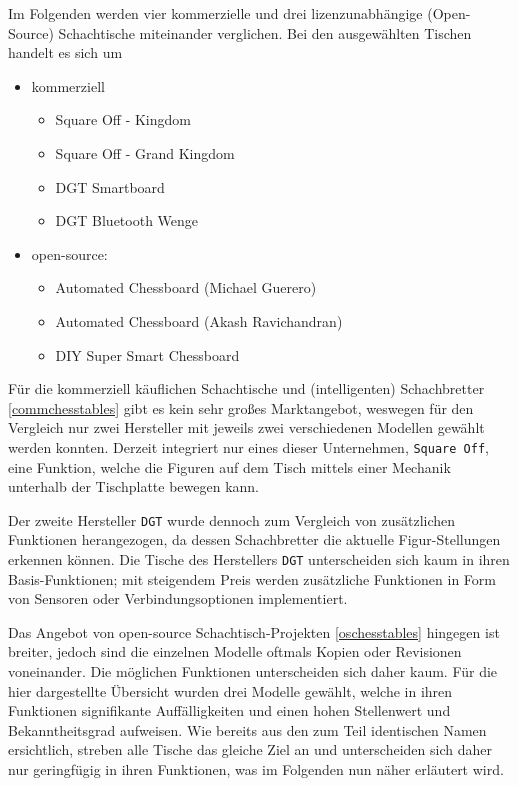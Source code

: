 Im Folgenden werden vier kommerzielle und drei lizenzunabhängige
(Open-Source) Schachtische miteinander verglichen. Bei den ausgewählten
Tischen handelt es sich um

\begin{itemize}
\tightlist
\item
  kommerziell

  \begin{itemize}
  \tightlist
  \item
    Square Off - Kingdom \cite{squareoffkingdom}
  \item
    Square Off - Grand Kingdom \cite{squareoffgrand}
  \item
    DGT Smartboard \cite{dtgsmartboard}
  \item
    DGT Bluetooth Wenge \cite{dtgble}
  \end{itemize}
\item
  open-source:

  \begin{itemize}
  \tightlist
  \item
    Automated Chessboard (Michael Guerero) \cite{actproject1}
  \item
    Automated Chessboard (Akash Ravichandran) \cite{actproject2}
  \item
    DIY Super Smart Chessboard \cite{actproject3}
  \end{itemize}
\end{itemize}

Für die kommerziell käuflichen Schachtische und (intelligenten)
Schachbretter \ref{commchesstables} gibt es kein sehr großes
Marktangebot, weswegen für den Vergleich nur zwei Hersteller mit jeweils
zwei verschiedenen Modellen gewählt werden konnten. Derzeit integriert
nur eines dieser Unternehmen, \passthrough{\lstinline!Square Off!}, eine
Funktion, welche die Figuren auf dem Tisch mittels einer Mechanik
unterhalb der Tischplatte bewegen kann.

Der zweite Hersteller \passthrough{\lstinline!DGT!} wurde dennoch zum
Vergleich von zusätzlichen Funktionen herangezogen, da dessen
Schachbretter die aktuelle Figur-Stellungen erkennen können. Die Tische
des Herstellers \passthrough{\lstinline!DGT!} unterscheiden sich kaum in
ihren Basis-Funktionen; mit steigendem Preis werden zusätzliche
Funktionen in Form von Sensoren oder Verbindungsoptionen implementiert.

Das Angebot von open-source Schachtisch-Projekten \ref{oschesstables}
hingegen ist breiter, jedoch sind die einzelnen Modelle oftmals Kopien
oder Revisionen voneinander. Die möglichen Funktionen unterscheiden sich
daher kaum. Für die hier dargestellte Übersicht wurden drei Modelle
gewählt, welche in ihren Funktionen signifikante Auffälligkeiten und
einen hohen Stellenwert und Bekanntheitsgrad aufweisen. Wie bereits aus
den zum Teil identischen Namen ersichtlich, streben alle Tische das
gleiche Ziel an und unterscheiden sich daher nur geringfügig in ihren
Funktionen, was im Folgenden nun näher erläutert wird.

